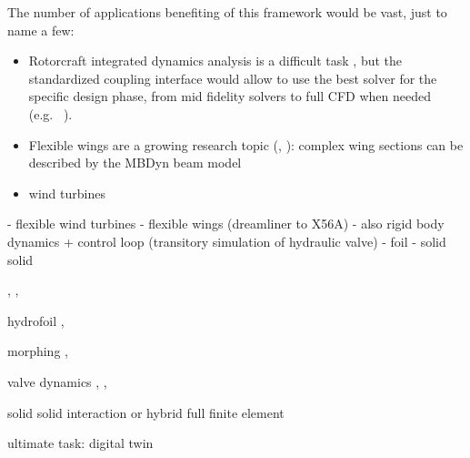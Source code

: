 The number of applications benefiting of this framework would be vast, just to name a few:

\begin{itemize}
    \item Rotorcraft integrated dynamics analysis is a difficult task \cite{quaranta2004toward},  but the standardized coupling interface would allow to use the best solver for the specific design phase, from mid fidelity solvers \cite{cocco2020simulation} to full CFD when needed (e.g.\ \cite{cavagna2009simulation}  \cite{masarati2011coupled}).
    \item Flexible wings are a growing research topic (\cite{pusch2019aeroelastic}, \cite{waitman2020h}): complex wing sections can be described by the MBDyn beam model
    \item wind turbines \cite{}
\end{itemize}


- flexible wind turbines
- flexible wings (dreamliner to X56A)
- also rigid body dynamics + control loop (transitory simulation of hydraulic valve)
- foil
- solid solid 




 \cite{guerri2008fluid}, \cite{rasheed2014comprehensive}, \cite{roul2020fluid} 

hydrofoil \cite{lupu2018absolute}, \cite{bousquet2017control}

morphing \cite{chanzy2018analysis}, \cite{li2018review}

valve dynamics \cite{amirante2006flow}, \cite{lisowski2013three}, \cite{frosina2017modeling}

solid solid interaction or hybrid full finite element \cite{cumnuantip2018assessment}



ultimate task: digital twin \cite{semeraro2021digital}



